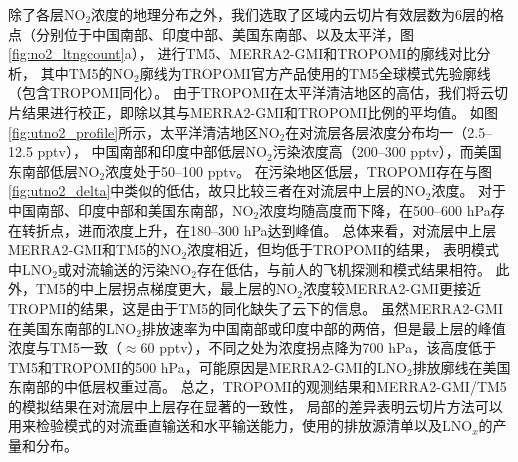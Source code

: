 除了各层NO$_2$浓度的地理分布之外，我们选取了区域内云切片有效层数为6层的格点（分别位于中国南部、印度中部、美国东南部、以及太平洋，图\ref{fig:no2_ltngcount}a），
进行TM5、MERRA2-GMI和TROPOMI的廓线对比分析，
其中TM5的NO$_2$廓线为TROPOMI官方产品使用的TM5全球模式先验廓线（包含TROPOMI同化）。
由于TROPOMI在太平洋清洁地区的高估，我们将云切片结果进行校正，即除以其与MERRA2-GMI和TROPOMI比例的平均值。
如图\ref{fig:utno2_profile}所示，太平洋清洁地区NO$_2$在对流层各层浓度分布均一（2.5--12.5 pptv），
中国南部和印度中部低层NO$_2$污染浓度高（200--300 pptv），而美国东南部低层NO$_2$浓度处于50--100 pptv。
在污染地区低层，TROPOMI存在与图\ref{fig:utno2_delta}中类似的低估，故只比较三者在对流层中上层的NO$_2$浓度。
对于中国南部、印度中部和美国东南部，NO$_2$浓度均随高度而下降，在500--600 hPa存在转折点，进而浓度上升，在180--300 hPa达到峰值。
总体来看，对流层中上层MERRA2-GMI和TM5的NO$_2$浓度相近，但均低于TROPOMI的结果，
表明模式中LNO$_2$或对流输送的污染NO$_2$存在低估，与前人的飞机探测和模式结果相符\citep{Laughner.2019a,Zhang.2022a}。
此外，TM5的中上层拐点梯度更大，最上层的NO$_2$浓度较MERRA2-GMI更接近TROPMI的结果，这是由于TM5的同化缺失了云下的信息。
虽然MERRA2-GMI在美国东南部的LNO$_2$排放速率为中国南部或印度中部的两倍，但是最上层的峰值浓度与TM5一致（$\approx$60 pptv），不同之处为浓度拐点降为700 hPa，该高度低于TM5和TROPOMI的500 hPa，可能原因是MERRA2-GMI的LNO$_2$排放廓线在美国东南部的中低层权重过高。
总之，TROPOMI的观测结果和MERRA2-GMI/TM5的模拟结果在对流层中上层存在显著的一致性，
局部的差异表明云切片方法可以用来检验模式的对流垂直输送和水平输送能力，使用的排放源清单以及LNO$_x$的产量和分布。


